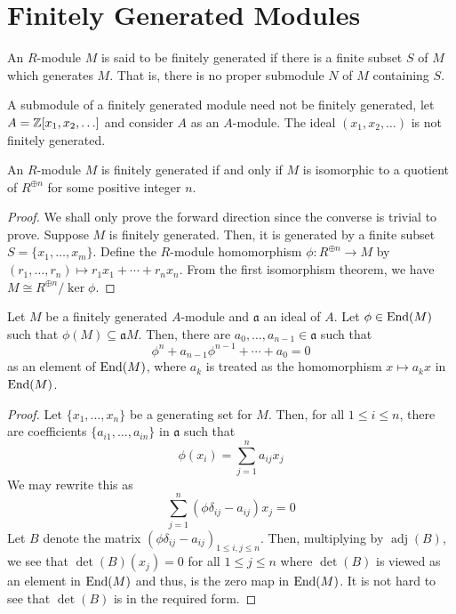 \section{Finitely Generated Modules}

\begin{definition}
    An $R$-module $M$ is said to be finitely generated if there is a finite subset $S$ of $M$ which generates $M$. That is, there is no proper submodule $N$ of $M$ containing $S$.
\end{definition}

A submodule of a finitely generated module need not be finitely generated, let $A = \mathbb{Z}[x_1,x_2,\ldots]$ and consider $A$ as an $A$-module. The ideal $(x_1,x_2,\ldots)$ is not finitely generated.

\begin{proposition}
    An $R$-module $M$ is finitely generated if and only if $M$ is isomorphic to a quotient of $R^{\oplus n}$ for some positive integer $n$.
\end{proposition}
\begin{proof}
    We shall only prove the forward direction since the converse is trivial to prove. Suppose $M$ is finitely generated. Then, it is generated by a finite subset $S = \{x_1,\ldots,x_m\}$. Define the $R$-module homomorphism $\phi:R^{\oplus n}\to M$ by $(r_1,\ldots,r_n)\mapsto r_1x_1 + \cdots + r_nx_n$. From the first isomorphism theorem, we have $M\cong R^{\oplus n}/\ker\phi$.
\end{proof}

\begin{proposition}
    Let $M$ be a finitely generated $A$-module and $\mathfrak a$ an ideal of $A$. Let $\phi\in\operatorname{End}(M)$ such that $\phi(M)\subseteq\mathfrak aM$. Then, there are $a_0,\ldots,a_{n - 1}\in\mathfrak a$ such that 
    \begin{equation*}
        \phi^n + a_{n - 1}\phi^{n - 1} + \cdots + a_0 = 0
    \end{equation*}
    as an element of $\operatorname{End}(M)$, where $a_k$ is treated as the homomorphism $x\mapsto a_kx$ in $\operatorname{End}(M)$.
\end{proposition}
\begin{proof}
    Let $\{x_1,\ldots,x_n\}$ be a generating set for $M$. Then, for all $1\le i\le n$, there are coefficients $\{a_{i1},\ldots,a_{in}\}$ in $\mathfrak a$ such that 
    \begin{equation*}
        \phi(x_i) = \sum_{j = 1}^n a_{ij}x_j
    \end{equation*}
    We may rewrite this as 
    \begin{equation*}
        \sum_{j = 1}^n(\phi\delta_{ij} - a_{ij})x_j = 0
    \end{equation*}
    Let $B$ denote the matrix $(\phi\delta_{ij} - a_{ij})_{1\le i,j\le n}$. Then, multiplying by $\operatorname{adj}(B)$, we see that $\det(B)(x_j) = 0$ for all $1\le j\le n$ where $\det(B)$ is viewed as an element in $\operatorname{End}(M)$ and thus, is the zero map in $\operatorname{End}(M)$. It is not hard to see that $\det(B)$ is in the required form.
\end{proof}

